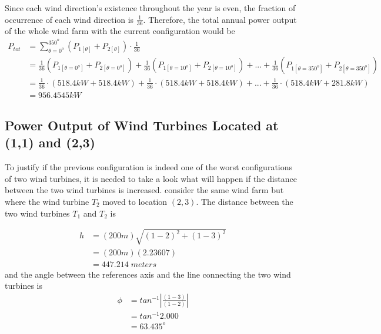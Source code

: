     Since each wind direction's existence throughout the year is even, the fraction of occurrence of each wind direction is $\frac{1}{36}$. Therefore, the total annual power output of the whole wind farm with the current configuration would be
    \begin{align*}
        P_{tot}
        &= \sum_{\theta=0^o}^{350^o} \left( P_{1[\theta]} + P_{2[\theta]} \right) \cdot \frac{1}{36} \\
        &= \frac{1}{36}\left( P_{1[\theta=0^o]} + P_{2[\theta=0^o]} \right) + \frac{1}{36}\left( P_{1[\theta=10^o]} + P_{2[\theta=10^o]} \right) +...+ \frac{1}{36}\left( P_{1[\theta=350^o]} + P_{2[\theta=350^o]} \right) \\
        &= \frac{1}{36}\cdot\left( 518.4kW + 518.4kW \right) + \frac{1}{36}\cdot\left( 518.4kW + 518.4kW \right) +...+ \frac{1}{36}\cdot\left( 518.4kW + 281.8kW \right) \\
        &=956.4545kW
    \end{align*}
    
\subsection{Power Output of Wind Turbines Located at (1,1) and (2,3)}  
    To justify if the previous configuration is indeed one of the worst configurations of two wind turbines, it is needed to take a look what will happen if the distance between the two wind turbines is increased. consider the same wind farm but where the wind turbine $T_2$ moved to location $(2,3)$. The distance between the two wind turbines $T_1$ and $T_2$ is
 
\begin{align*}
	h
	&=(200m)\sqrt{(1-2)^2+(1-3)^2} \\
	&=(200m)(2.23607) \\
	&=447.214\;meters
\end{align*}
and the angle between the references axis and the line connecting the two wind turbines is
\begin{align*}
	\phi
	&=tan^{-1}\left| \frac{(1-3)}{(1-2)} \right| \\
	&=tan^{-1} 2.000 \\
	&=63.435^o
\end{align*}

